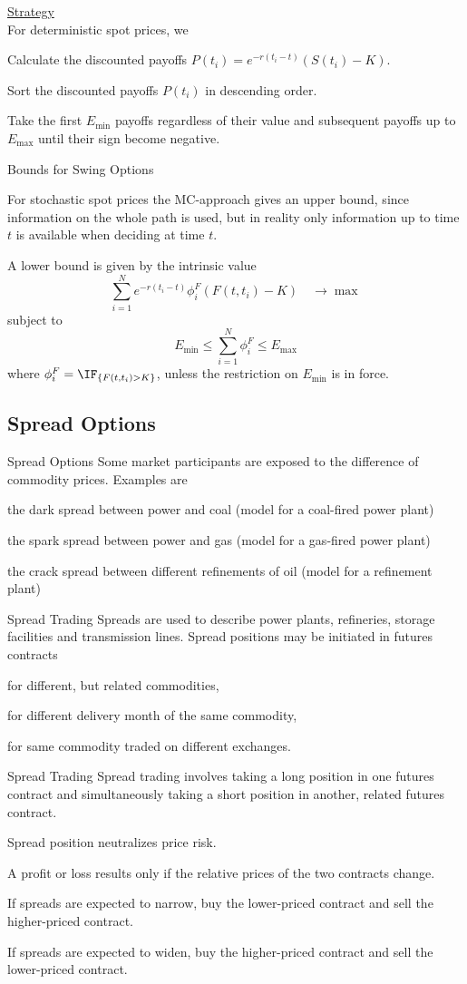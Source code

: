 \underline{Strategy}\\
For deterministic spot prices, we
  \item  Calculate the discounted payoffs
  $P(t_i)=e^{-r(t_i-t)}(S(t_i)-K)$.
  \item  Sort the discounted payoffs $P(t_i)$ in descending order.
  \item Take the first $E_{\min}$ payoffs regardless of their
  value and subsequent payoffs up to $E_{\max}$ until their sign
  become negative.

{Bounds for Swing Options}

For stochastic spot prices the MC-approach gives an upper bound,
since information on the whole path is used, but in reality only
information up to time $t$ is available when deciding at time $t$.

A lower bound is given by the intrinsic value
$$\sum_{i=1}^Ne^{-r(t_i-t)} \phi_i^F (F(t,t_i)-K) \quad\rightarrow\max$$
subject to $$E_{\min}\leq\sum_{i=1}^N\phi^F_i\leq E_{\max}$$
where $\phi_i^F=\IF_{\{F(t,t_i)>K\}}$, unless the restriction on $E_{\min}$ is in force.

\subsection{Spread Options}

{Spread Options}
Some market participants are exposed to the difference of
commodity prices. Examples are
  \item<1-> the dark spread between power and coal (model for a coal-fired power plant)
  \item<2-> the spark spread between power and gas (model for a gas-fired power plant)
  \item<3-> the crack spread between different refinements of oil (model for a refinement plant)

{Spread Trading}
Spreads are used to describe power plants, refineries, storage facilities and transmission lines. Spread positions may be initiated in futures contracts
  \item<1-> for different, but related commodities,
  \item<2-> for different delivery month of the same commodity,
  \item<3-> for same commodity traded on different exchanges.

{Spread Trading}
Spread trading involves taking a long position in one futures contract and simultaneously taking a short position in another, related futures contract.
  \item<1-> Spread position neutralizes price risk.
  \item<2-> A profit or loss results only if the relative prices of the two contracts change.
  \item<3-> If spreads are expected to narrow, buy the lower-priced contract and sell the higher-priced contract.
  \item<4-> If spreads are expected to widen, buy the higher-priced contract and sell the lower-priced contract.

